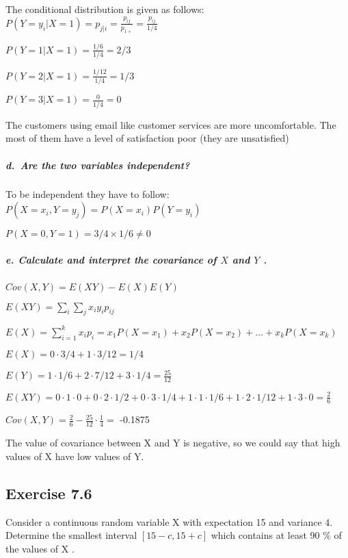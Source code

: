 \documentclass[
]{article}
\begin{document}
The conditional distribution is given as follows:
\(\displaystyle P(Y = y_i | X = 1) = p_{j|i} = \frac{p_{ij}}{p_{1+}} = \frac{p_{ij}}{1/4}\)

\(P(Y = 1 | X = 1) = \frac{1/6}{1/4} = 2/3\)

\(P(Y = 2 | X = 1) = \frac{1/12}{1/4} = 1/3\)

\(P(Y = 3 | X = 1) = \frac{0}{1/4} = 0\)

The customers using email like customer services are more uncomfortable.
The most of them have a level of satisfaction poor (they are
unsatisfied)

\hypertarget{d.-are-the-two-variables-independent}{%
\subparagraph{d.~Are the two variables
independent?}\label{d.-are-the-two-variables-independent}}

To be independent they have to follow:
\(P(X = x_i, Y = y_j) = P(X=x_i)P(Y = y_i)\)

\(P(X = 0, Y = 1) = 3/4 \times 1/6 \neq 0\)

\hypertarget{e.-calculate-and-interpret-the-covariance-of-x-and-y-.}{%
\subparagraph{\texorpdfstring{e. Calculate and interpret the covariance
of \(X\) and \(Y\)
.}{e. Calculate and interpret the covariance of X and Y .}}\label{e.-calculate-and-interpret-the-covariance-of-x-and-y-.}}

\(Cov(X,Y) = E(XY) - E(X)E(Y)\)

\(E(XY) = \sum_i \sum_j x_iy_ip_{ij}\)

\(\displaystyle E(X) = \sum\limits_{i=1}^kx_ip_i = x_1P(X=x_1)+x_2P(X=x_2)+ ... + x_kP(X=x_k)\)

\(E(X) = 0 \cdot 3/4 + 1 \cdot 3/12 = 1/4\)

\(E(Y) = 1 \cdot 1/6 + 2 \cdot 7/12 + 3 \cdot 1/4 = \frac{25}{12}\)

\(E(XY) = 0 \cdot 1 \cdot 0 + 0 \cdot 2 \cdot 1/2 + 0 \cdot 3 \cdot 1/4 + 1 \cdot 1 \cdot 1/6 + 1\cdot 2\cdot 1/12 + 1 \cdot 3\cdot 0 = \frac{2}{6}\)

\(Cov(X,Y) = \frac{2}{6} - \frac{25}{12} \cdot \frac{1}{4} =\) -0.1875

The value of covariance between X and Y is negative, so we could say
that high values of X have low values of Y.

\hypertarget{exercise-7.6}{%
\subsection{Exercise 7.6}\label{exercise-7.6}}

Consider a continuous random variable X with expectation 15 and variance
4. Determine the smallest interval \([15 − c, 15 + c]\) which contains
at least 90 \(\%\) of the values of X .
\end{document}
